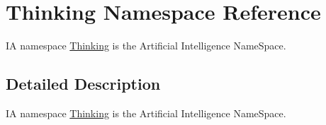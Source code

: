 \hypertarget{namespaceThinking}{
\section{Thinking Namespace Reference}
\label{namespaceThinking}
}


IA namespace \hyperlink{namespaceThinking}{Thinking} is the Artificial Intelligence NameSpace.  




\subsection{Detailed Description}
IA namespace \hyperlink{namespaceThinking}{Thinking} is the Artificial Intelligence NameSpace. 
